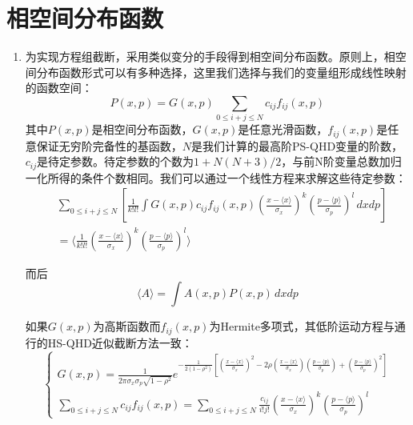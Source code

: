 \documentclass[12pt,a4paper,openany,twoside]{book}
\numberwithin{equation}{section}
\newcommand{\mean}[1]{\langle #1 \rangle}
\begin{document}
\section{相空间分布函数}
\begin{enumerate}
  \item 为实现方程组截断，采用类似变分的手段得到相空间分布函数。原则上，相空间分布函数形式可以有多种选择，这里我们选择与我们的变量组形成线性映射的函数空间：
  \begin{equation}
  P(x,p)=G(x,p)\sum_{0 \leq i+j \leq N} c_{ij} f_{ij} (x,p)
  \end{equation}
  其中$P(x,p)$是相空间分布函数，$G(x,p)$是任意光滑函数，$f_{ij}(x,p)$是任意保证无穷阶完备性的基函数，$N$是我们计算的最高阶PS-QHD变量的阶数，$c_{ij}$是待定参数。待定参数的个数为$1+N(N+3)/2$，与前N阶变量总数加归一化所得的条件个数相同。我们可以通过一个线性方程来求解这些待定参数：
  \begin{align*}
  &\sum_{0\leq i+j\leq N}\left[\frac{1}{k!l!}\int G(x,p)c_{ij}f_{ij}(x,p)\left(\frac{x-\mean{x}}{\sigma_x}\right)^{k}\left(\frac{p-\mean{p}}{\sigma_p}\right)^{l}\,dxdp\right]\\
  &=\mean{\frac{1}{k!l!}\left(\frac{x-\mean{x}}{\sigma_x}\right)^{k}\left(\frac{p-\mean{p}}{\sigma_p}\right)^{l}}
  \end{align*}

  而后
  \begin{equation}
  \mean{A}=\int A(x,p) P(x,p) \, dxdp
  \end{equation}

  如果$G(x,p)$为高斯函数而$f_{ij}(x,p)$为Hermite多项式，其低阶运动方程与通行的HS-QHD近似截断方法一致：
  \begin{equation}
  \begin{cases}
  G(x,p)=\frac{1}{2\pi \sigma_x\sigma_p\sqrt{1-\rho^2}}e^{-\frac{1}{2(1-\rho^2)}\left[\left(\frac{x-\mean{x}}{\sigma_x}\right)^2-2\rho\left(\frac{x-\mean{x}}{\sigma_x}\right)\left(\frac{p-\mean{p}}{\sigma_p}\right)+\left(\frac{p-\mean{p}}{\sigma_p}\right)^2\right]}\\
  \sum_{0\leq i+j \leq N}c_{ij}f_{ij}(x,p)=\sum_{0\leq i+j \leq N}\frac{c_{ij}}{i!j!}\left(\frac{x-\mean{x}}{\sigma_x}\right)^{k}\left(\frac{p-\mean{p}}{\sigma_p}\right)^{l}
  \end{cases}
  \end{equation}
\end{enumerate}




      
      


  
\end{document}
